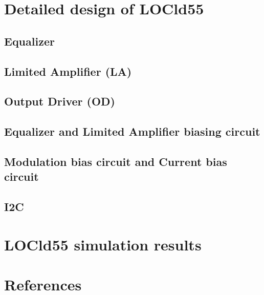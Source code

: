 \documentclass[15pt,a4paper]{article}
\begin{document}
\begin{spacing}{1.25}
\section{Detailed design of LOCld55}        %
\subsection{Equalizer}

\subsection{Limited Amplifier (LA)}

\subsection{Output Driver (OD)}

\subsection{Equalizer and Limited Amplifier biasing circuit}

\subsection{Modulation bias circuit and Current bias circuit}

\subsection{I2C}

\section{LOCld55 simulation results}        %

\section{References}                        %

\end{spacing}
\end{document}
